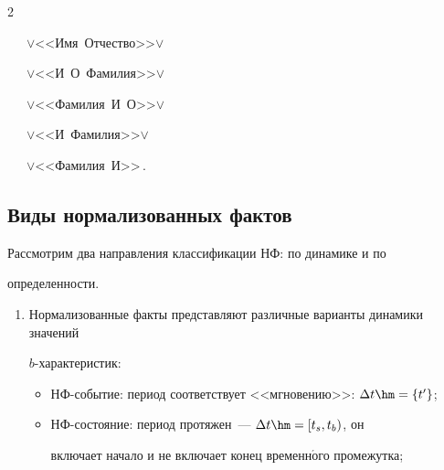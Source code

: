 \begin{multicols}{2}
\noindent


\ \ \ $\vee$\;<<Имя\ Отчество>>\;$\vee$ %





\noindent


\ \ \ $\vee$\;<<И\ О\ Фамилия>>\;$\vee$ %





\noindent


\ \ \ $\vee$\;<<Фамилия\ И\ О>>\;$\vee$





\noindent


\ \ \ $\vee$\;<<И\ Фамилия>>\;$\vee$





\noindent


\ \ \ $\vee$\;<<Фамилия\ И>>\,. 










\subsection{Виды нормализованных фактов}


  


  Рассмотрим два направления классификации НФ: по динамике и по 


определенности.


  \begin{enumerate}[1.]


\item Нормализованные факты представляют различные варианты динамики значений  


$b$-ха\-рак\-те\-ристик:


\begin{itemize}


\item НФ-событие: период соответствует <<мгновению>>: $\Delta 


t\hm=\{t^\prime\}$;


\item НФ-состояние: период протяжен~--- $\Delta t\hm= [t_s, t_b)$, он 


включает начало и не включает конец временн$\acute{\mbox{о}}$го промежутка;



\end{itemize}
\end{enumerate}
\end{multicols}
